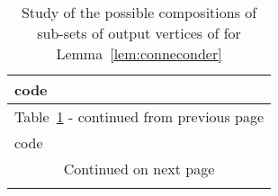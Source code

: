 \documentclass[a4paper,UKenglish]{lipics-v2016}
\begin{document}
	\begin{longtable}[c]{|p{}||p{}||p{} p{} p{} p{} p{} p{} p{}|p{}|}
		\caption{Study of the possible compositions of sub-sets of output vertices of  for Lemma~\ref{lem:conneconder}}\label{table:configurations}\\ 
		\hline
		code &  &  &  &  &  &  &  &  &   \\\hline
		\endfirsthead
		\hline
		\multicolumn{10}{|c|}{{Table~\ref{table:configurations} - continued from previous page}}\\\hline
		code &  &  &  &  &  &  &  &  &  \\\hline
		\endhead
		
		\hline
		\multicolumn{10}{|c|}{{Continued on next page}}\\\hline
		\endfoot	
		

\end{longtable}
\end{document}
